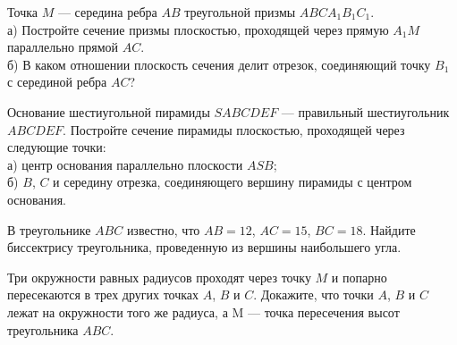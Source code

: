 \newpage
{}
\begin{listofex}
	\item Точка \( M \) --- середина ребра \( AB \) треугольной призмы \( ABCA_1B_1C_1 \).\\
	а) Постройте сечение призмы плоскостью, проходящей через прямую \( A_1M \) параллельно прямой \( AC \).\\
	б) В каком отношении плоскость сечения делит отрезок, соединяющий точку \( B_1 \) с серединой ребра \( AC \)?
	\item Основание шестиугольной пирамиды \( SABCDEF \) --- правильный шестиугольник \( ABCDEF \). Постройте сечение пирамиды плоскостью, проходящей через следующие точки:\\
	а) центр основания параллельно плоскости \( ASB \);\\
	б) \( B \), \( C \) и середину отрезка, соединяющего вершину пирамиды с центром основания.
	\item В треугольнике \( ABC \) известно, что \( AB = 12 \), \( AC = 15 \),
	\( BC = 18 \). Найдите биссектрису треугольника, проведенную из вершины наибольшего угла.
	\item Три окружности равных радиусов проходят через точку \( M \) и попарно пересекаются в трех других точках \( A \), \( B \) и \( C \). Докажите, что точки \( A \), \( B \) и \( C \) лежат на окружности того же радиуса, а M --- точка пересечения высот треугольника \( ABC \).
\end{listofex}
